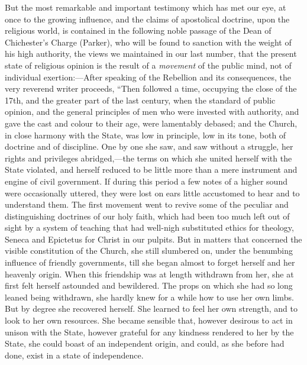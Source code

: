 But the most remarkable and important testimony
which has met our eye, at once to the growing influence, and the claims
of apostolical doctrine, upon the religious world, is contained in the
following noble passage of the Dean of Chichester's Charge (Parker), who
will be found to sanction with the weight of his high authority, the
views we maintained in our last number, that the present state of
religious opinion is the result of a \emph{movement} of the public mind,
not of individual exertion:—After speaking of the Rebellion and its
consequences, the very reverend writer proceeds, ``Then followed a time,
occupying the close of the 17th, and the greater part of the last
century, when the standard of public opinion, and the general principles
of men who were invested with authority, and gave the cast and colour to
their age, were lamentably debased; and the Church, in close harmony
with the State, was low in principle, low in its tone, both of doctrine
and of discipline. One by one she saw, and saw without a struggle, her
rights and privileges abridged,—the terms on which she united herself
with the State violated, and herself reduced to be little more than a
mere instrument and engine of civil government. If during this
period a few notes of a higher sound were occasionally uttered, they
were lost on ears little accustomed to hear and to understand them. The
first movement went to revive some of the peculiar and distinguishing
doctrines of our holy faith, which had been too much left out of sight
by a system of teaching that had well-nigh substituted ethics for
theology, Seneca and Epictetus for Christ in our pulpits. But in matters
that concerned the visible constitution of the Church, she still
slumbered on, under the benumbing influence of friendly governments,
till she began almost to forget herself and her heavenly origin. When
this friendship was at length withdrawn from her, she at first felt
herself astounded and bewildered. The props on which she had so long
leaned being withdrawn, she hardly knew for a while how to use her own
limbs. But by degree she recovered herself. She learned to feel her own
strength, and to look to her own resources. She became sensible that,
however desirous to act in unison with the State, however grateful for
any kindness rendered to her by the State, she could boast of an
independent origin, and could, as she before had done, exist in a state
of independence.

